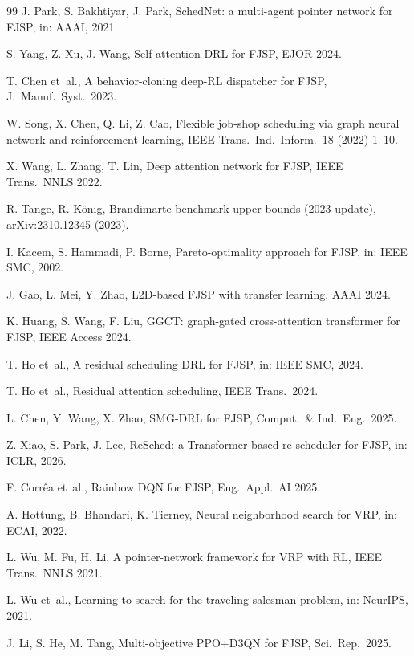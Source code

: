 \documentclass[preprint,review,3p,times,twocolumn]{elsarticle}
\newcommand{\etal}{et~al.\!}
\begin{document}
\begin{thebibliography}{99}
J. Park, S. Bakhtiyar, J. Park, SchedNet: a multi-agent
pointer network for FJSP, in: AAAI, 2021.

S. Yang, Z. Xu, J. Wang, Self-attention DRL for FJSP,
EJOR 2024.

T. Chen \etal, A behavior-cloning deep-RL dispatcher
for FJSP, J.\ Manuf.\ Syst.\ 2023.

W. Song, X. Chen, Q. Li, Z. Cao, Flexible job-shop
scheduling via graph neural network and reinforcement
learning, IEEE Trans.\ Ind.\ Inform.\ 18 (2022) 1--10.

X. Wang, L. Zhang, T. Lin, Deep attention network for
FJSP, IEEE Trans.\ NNLS 2022.

R. Tange, R. K{\"o}nig, Brandimarte benchmark upper
bounds (2023 update), arXiv:2310.12345 (2023).

I. Kacem, S. Hammadi, P. Borne, Pareto-optimality
approach for FJSP, in: IEEE SMC, 2002.

J. Gao, L. Mei, Y. Zhao, L2D-based FJSP with transfer
learning, AAAI 2024.

K. Huang, S. Wang, F. Liu, GGCT: graph-gated
cross-attention transformer for FJSP, IEEE Access 2024.

T. Ho \etal, A residual scheduling DRL for FJSP, in:
IEEE SMC, 2024.

T. Ho \etal, Residual attention scheduling, IEEE
Trans.\ 2024.

L. Chen, Y. Wang, X. Zhao, SMG-DRL for FJSP, Comput.\ \&
Ind.\ Eng.\ 2025.

Z. Xiao, S. Park, J. Lee, ReSched: a Transformer-based
re-scheduler for FJSP, in: ICLR, 2026.

F. Corr\^ea \etal, Rainbow DQN for FJSP, Eng.\ Appl.\ AI
2025.

A. Hottung, B. Bhandari, K. Tierney, Neural
neighborhood search for VRP, in: ECAI, 2022.

L. Wu, M. Fu, H. Li, A pointer-network framework for
VRP with RL, IEEE Trans.\ NNLS 2021.

L. Wu \etal, Learning to search for the traveling
salesman problem, in: NeurIPS, 2021.

J. Li, S. He, M. Tang, Multi-objective PPO+D3QN for
FJSP, Sci.\ Rep.\ 2025.


\end{thebibliography}
\end{document}
